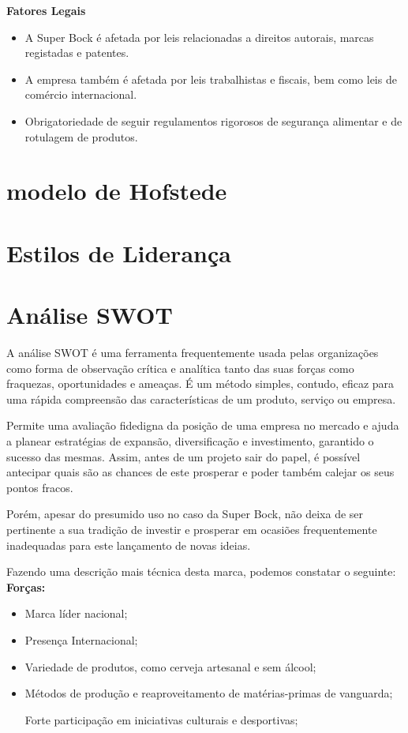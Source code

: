 \noindent \textbf{Fatores Legais} %
\begin{itemize}
    \item A Super Bock é afetada por leis relacionadas a direitos autorais, marcas registadas e patentes.
    \item A empresa também é afetada por leis trabalhistas e fiscais, bem como leis de comércio internacional.
    \item Obrigatoriedade de seguir regulamentos rigorosos de segurança alimentar e de rotulagem de produtos.
\end{itemize}

\section{modelo de Hofstede}
\section{Estilos de Liderança}
\section{Análise SWOT}

A análise SWOT é uma ferramenta frequentemente usada pelas organizações como forma de observação crítica e analítica tanto das suas forças como fraquezas, oportunidades e ameaças. É um método simples, contudo, eficaz para uma rápida compreensão das características de um produto, serviço ou empresa. 

Permite uma avaliação fidedigna da posição de uma empresa no mercado e ajuda a planear estratégias de expansão, diversificação e investimento, garantido o sucesso das mesmas. Assim, antes de um projeto sair do papel, é possível antecipar quais são as chances de este prosperar e poder também calejar os seus pontos fracos. 

Porém, apesar do presumido uso no caso da Super Bock, não deixa de ser pertinente a sua tradição de investir e prosperar em ocasiões frequentemente inadequadas para este lançamento de novas ideias. 

Fazendo uma descrição mais técnica desta marca, podemos constatar o seguinte:\\

\noindent \textbf{Forças:}
\begin{itemize}
    
    \item Marca líder nacional; 

    \item Presença Internacional; 

    \item Variedade de produtos, como cerveja artesanal e sem álcool; 

    \item Métodos de produção e reaproveitamento de matérias-primas de vanguarda; 

Forte participação em iniciativas culturais e desportivas; 
\end{itemize}

